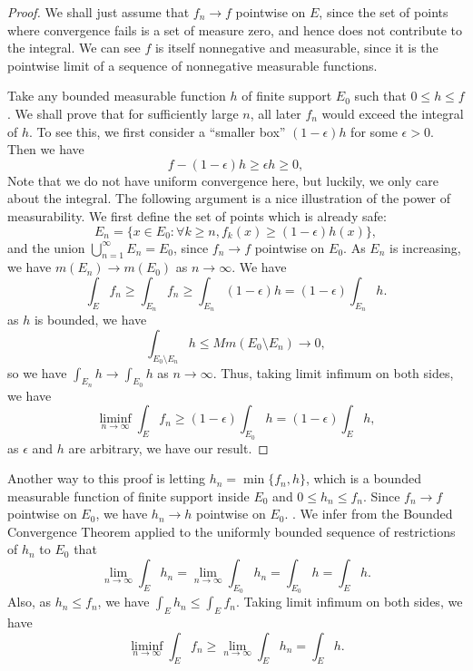 \documentclass[../main.tex]{subfiles}
\begin{document}
\begin{proof}
	We shall just assume that $f_n \to f$ pointwise on $E$, since the set of points where convergence fails is a set of measure zero, and hence does not contribute to the integral. We can see $f$ is itself nonnegative and measurable, since it is the pointwise limit of a sequence of nonnegative measurable functions.

	Take any bounded measurable function $h$ of finite support $E_0$ such that $0 \leq h \leq f$. We shall prove that for sufficiently large $n$, all later $f_n$ would exceed the integral of $h$. To see this, we first consider a ``smaller box'' $(1 - \epsilon) h$ for some $\epsilon > 0$. Then we have
	\begin{equation*}
		f - (1 - \epsilon) h \geq \epsilon h \geq 0,
	\end{equation*}
	Note that we do not have uniform convergence here, but luckily, we only care about the integral. The following argument is a nice illustration of the power of measurability. We first define the set of points which is already safe:
	\begin{equation}
		E_n = \{x \in E_0 : \forall k \geq n, f_k(x) \geq (1 - \epsilon) h(x)\},
	\end{equation}
	and the union $\bigcup_{n=1}^{\infty} E_n = E_0$, since $f_n \to f$ pointwise on $E_0$. As $E_n$ is increasing, we have $m(E_n) \to m(E_0)$ as $n \to \infty$. We have
	\begin{equation*}
		\int_E f_n \geq \int_{E_n} f_n \geq \int_{E_n} (1 - \epsilon) h = (1 - \epsilon) \int_{E_n} h.
	\end{equation*}
	as $h$ is bounded, we have
	\begin{equation*}
		\int_{E_0 \setminus E_n} h \leq M m(E_0 \setminus E_n) \to 0,
	\end{equation*}
	so we have $\int_{E_n} h \to \int_{E_0} h$ as $n \to \infty$. Thus, taking limit infimum on both sides, we have
	\begin{equation*}
		\liminf_{n \to \infty} \int_E f_n \geq (1 - \epsilon) \int_{E_0} h = (1 - \epsilon) \int_E h,
	\end{equation*}
	as $\epsilon$ and $h$ are arbitrary, we have our result.
\end{proof}

\begin{remark}
	Another way to this proof is letting $h_n = \min\{f_n, h\}$, which is a bounded measurable function of finite support inside $E_0$ and $0 \leq h_n \leq f_n$. Since $f_n \to f$ pointwise on $E_0$, we have $h_n \to h$ pointwise on $E_0$. . We infer from the Bounded Convergence Theorem applied to the uniformly bounded sequence of restrictions of $h_n$ to $E_0$ that
	\begin{equation*}
		\lim_{n \to \infty} \int_E h_n = \lim_{n \to \infty} \int_{E_0} h_n = \int_{E_0} h = \int_E h.
	\end{equation*}
	Also, as $h_n \leq f_n$, we have $\int_E h_n \leq \int_E f_n$. Taking limit infimum on both sides, we have
	\begin{equation*}
		\liminf_{n \to \infty} \int_E f_n \geq \lim_{n \to \infty} \int_E h_n = \int_E h.
	\end{equation*}
\end{remark}
\end{document}
